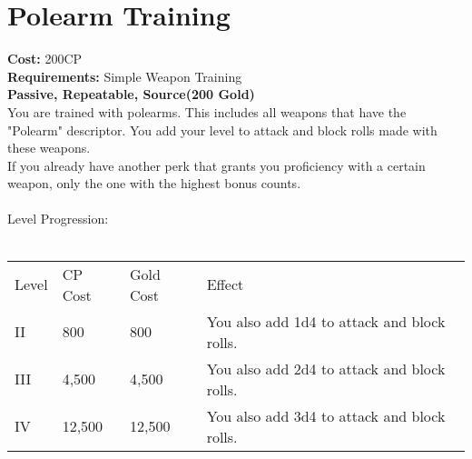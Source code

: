 \section{Polearm Training}\label{perk:polearmTraining}
\textbf{Cost:} 200CP\\
\textbf{Requirements:} Simple Weapon Training\\
\textbf{Passive, Repeatable, Source(200 Gold)}\\
You are trained with polearms.
This includes all weapons that have the "Polearm" descriptor.
You add your level to attack and block rolls made with these weapons.\\
If you already have another perk that grants you proficiency with a certain weapon, only the one with the highest bonus counts.\\
\\
Level Progression:\\
\\
\begin{tabular}{l | l | l | l}
	Level & CP Cost & Gold Cost & Effect\\
	II & 800 & 800 & You also add 1d4 to attack and block rolls.\\
	III & 4,500 & 4,500 & You also add 2d4 to attack and block rolls.\\
	IV & 12,500 & 12,500 & You also add 3d4 to attack and block rolls.\\
\end{tabular}